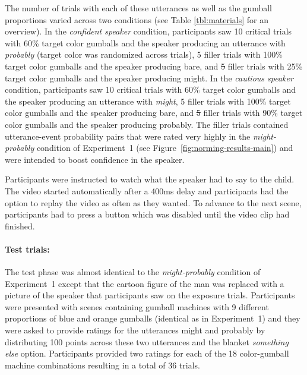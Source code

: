 \documentclass[man, floatsintext]{apa6}
\newcommand{\figref}[1]{Figure~\ref{#1}}
\providecommand{\DIFadd}[1]{{\protect\color{blue}\uwave{#1}}} %
\providecommand{\DIFdel}[1]{{\protect\color{red}\sout{#1}}}                      %
\providecommand{\DIFaddbegin}{} %
\providecommand{\DIFaddend}{} %
\providecommand{\DIFdelbegin}{} %
\providecommand{\DIFdelend}{} %
\providecommand{\DIFaddFL}[1]{\DIFadd{#1}} %
\providecommand{\DIFdelFL}[1]{\DIFdel{#1}} %
\providecommand{\DIFaddbeginFL}{} %
\providecommand{\DIFaddendFL}{} %
\providecommand{\DIFdelbeginFL}{} %
\providecommand{\DIFdelendFL}{} %
\newcommand{\DIFscaledelfig}{0.5}
\newlength{\DIFdelgraphicswidth} %
\newlength{\DIFdelgraphicsheight} %
\newcommand{\DIFaddincludegraphics}[2][]{{\color{blue}\fbox{\DIFOincludegraphics[#1]{#2}}}} %
\newcommand{\DIFdelincludegraphics}[2][]{%
\sbox{\DIFdelgraphicsbox}{\DIFOincludegraphics[#1]{#2}}%
\settoboxwidth{\DIFdelgraphicswidth}{\DIFdelgraphicsbox} %
\settoboxtotalheight{\DIFdelgraphicsheight}{\DIFdelgraphicsbox} %
\scalebox{\DIFscaledelfig}{%
\parbox[b]{\DIFdelgraphicswidth}{\usebox{\DIFdelgraphicsbox}\\[-\baselineskip] \rule{\DIFdelgraphicswidth}{0em}}\llap{\resizebox{\DIFdelgraphicswidth}{\DIFdelgraphicsheight}{%
\setlength{\unitlength}{\DIFdelgraphicswidth}%
\begin{picture}(1,1)%
\thicklines\linethickness{2pt} %
{\color[rgb]{1,0,0}\put(0,0){\framebox(1,1){}}}%
{\color[rgb]{1,0,0}\put(0,0){\line( 1,1){1}}}%
{\color[rgb]{1,0,0}\put(0,1){\line(1,-1){1}}}%
\end{picture}%
}\hspace*{3pt}}} %
} %
\DeclareRobustCommand{\DIFaddbegin}{\DIFOaddbegin \let\includegraphics\DIFaddincludegraphics} %
\DeclareRobustCommand{\DIFaddend}{\DIFOaddend \let\includegraphics\DIFOincludegraphics} %
\DeclareRobustCommand{\DIFdelbegin}{\DIFOdelbegin \let\includegraphics\DIFdelincludegraphics} %
\DeclareRobustCommand{\DIFdelend}{\DIFOaddend \let\includegraphics\DIFOincludegraphics} %
\DeclareRobustCommand{\DIFaddbeginFL}{\DIFOaddbeginFL \let\includegraphics\DIFaddincludegraphics} %
\DeclareRobustCommand{\DIFaddendFL}{\DIFOaddendFL \let\includegraphics\DIFOincludegraphics} %
\DeclareRobustCommand{\DIFdelbeginFL}{\DIFOdelbeginFL \let\includegraphics\DIFdelincludegraphics} %
\DeclareRobustCommand{\DIFdelendFL}{\DIFOaddendFL \let\includegraphics\DIFOincludegraphics} %
\begin{document}
%

The number of trials with each of these utterances as well as the gumball proportions varied across two conditions (see Table \ref{tbl:materials} for an overview). In the {\it confident speaker} condition, participants saw 10 critical trials with 60\% target color gumballs and the speaker producing an utterance with \emph{probably} (target color was randomized across trials), 5 filler trials with 100\% target color gumballs and the speaker producing {\sc bare}, and \DIFdelbegin \DIFdel{5 }\DIFdelend \DIFaddbegin \DIFadd{10 }\DIFaddend filler trials with 25\% target color gumballs and the speaker producing {\sc might}. In the {\it cautious speaker} condition, participants saw 10 critical trials with 60\% target color gumballs and the speaker producing an utterance with \emph{might}, 5 filler trials with 100\% target color gumballs and the speaker producing {\sc bare}, and \DIFdelbegin \DIFdel{5 }\DIFdelend \DIFaddbegin \DIFadd{10 }\DIFaddend filler trials with 90\% target color gumballs and the speaker producing {\sc probably}. The filler trials contained utterance-event probability pairs that were rated very highly in the \textit{might-probably} condition of Experiment~1 (see \figref{fig:norming-results-main}) and were intended to boost confidence in the speaker.

Participants were instructed to watch what the speaker had to say to the child. The video started automatically after a 400ms delay and participants had the option to replay the video as often as they wanted. To advance to the next scene, participants had to press a button which was disabled until the video clip had finished.

\paragraph{Test trials:} The test phase was almost identical to the  \textit{might-probably} condition of Experiment~1 except that the cartoon figure of the man was replaced with a picture of the speaker that participants saw on the exposure trials. Participants were presented with scenes containing gumball machines with 9 different proportions of blue and orange gumballs  (identical as in Experiment~1) and they were asked to provide ratings for the utterances {\sc might} and {\sc probably} by distributing 100 points across these two utterances and the blanket {\it something else} option. Participants provided two ratings for each of the 18 color-gumball machine combinations resulting in a total of 36 trials. 
\end{document}
